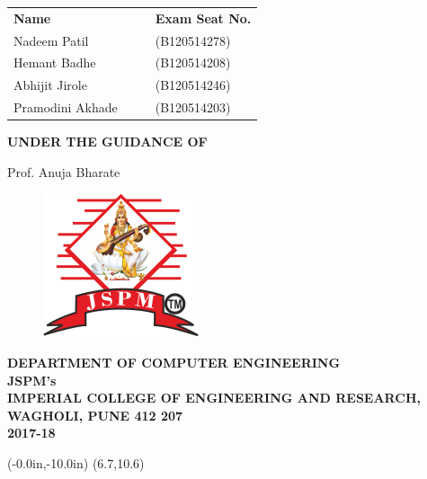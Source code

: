 \documentclass[12pt,a4paper]
{article}
\numberwithin{table}{section}
\begin{document}
	
	\begin{table}[htbp]
\begin{center}
\begin{tabular}{l c c l}
\large\bf{\color{black}Name} & & & \large\bf{\color{black}Exam Seat No.}\\[0.3cm]
\large{\color{black}Nadeem Patil } & & & \large{\color{black}(B120514278)} \\
\large{\color{black}Hemant Badhe } & & & \large{\color{black}(B120514208)}\\
\large{\color{black}Abhijit Jirole } & & & \large{\color{black}(B120514246)}\\ 
\large{\color{black}Pramodini Akhade } & & & \large{\color{black}(B120514203)}\\
\end{tabular}
\end{center}
\end{table}
	\begin{center}
	  \textbf{UNDER THE GUIDANCE OF}\\
	  
	\end{center}
		\begin{center}Prof. Anuja Bharate
	  \begin{figure}[h]
			\centering
			\includegraphics[width=2.5 cm]{logo.JPG}
		\end{figure}
	\end{center}
		\begin{center}
	  \textbf{DEPARTMENT OF COMPUTER ENGINEERING}\\
	 \textbf{ JSPM's\\
	  IMPERIAL COLLEGE OF ENGINEERING AND RESEARCH,\\
	  WAGHOLI, PUNE 412 207\\2017-18}
	  
	\end{center}




\newpage
\pagestyle{empty}
	\thisfancyput(-0.0in,-10.0in){%
\setlength{\unitlength}{1in}\framebox(6.7,10.6)}
\end{document}
